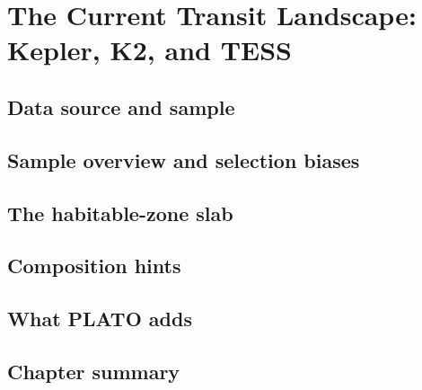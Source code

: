 \chapter{The Current Transit Landscape: Kepler, K2, and TESS}
\label{chap:kepler_tess}


\section{Data source and sample}
\label{sec:kt_data_source}


\section{Sample overview and selection biases}
\label{sec:kt_sample_overview}


\section{The habitable-zone slab}
\label{sec:kt_hz_zoom}


\section{Composition hints}
\label{sec:kt_composition}


\section{What PLATO adds}
\label{sec:kt_platos_role}


\section{Chapter summary}
\label{sec:kt_summary}

